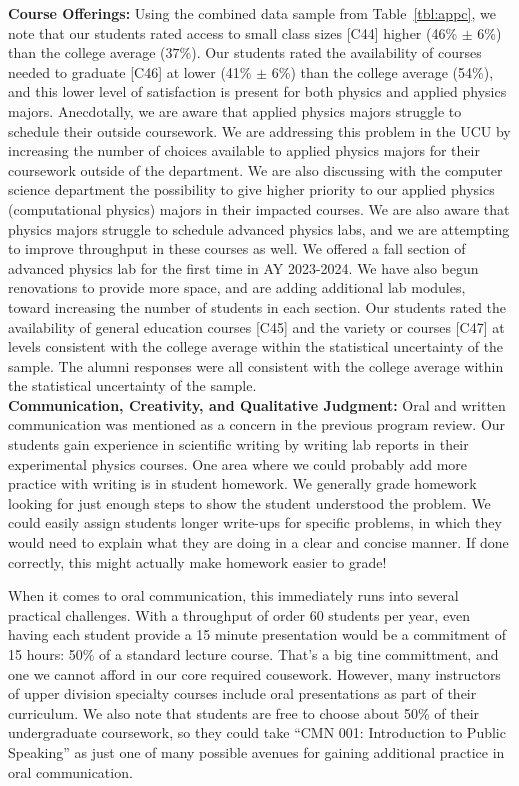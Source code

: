 \documentclass[12pt]{article}
\begin{document}
\noindent
{\bf Course Offerings:} Using the combined data sample from
Table~\ref{tbl:appc}, we note that our students rated access to small
class sizes [C44] higher (46\% $\pm$ 6\%) than the college average
($37\%$).  Our students rated the availability of courses needed to
graduate [C46] at lower (41\% $\pm$ 6\%) than the college average
(54\%), and this lower level of satisfaction is present for both
physics and applied physics majors.  Anecdotally, we are aware that
applied physics majors struggle to schedule their outside coursework.
We are addressing this problem in the UCU by increasing the number of
choices available to applied physics majors for their coursework
outside of the department.  We are also discussing with the computer
science department the possibility to give higher priority to our
applied physics (computational physics) majors in their impacted
courses.  We are also aware that physics majors struggle to schedule
advanced physics labs, and we are attempting to improve throughput in
these courses as well.  We offered a fall section of advanced physics
lab for the first time in AY 2023-2024.  We have also begun
renovations to provide more space, and are adding additional lab
modules, toward increasing the number of students in each section.
Our students rated the availability of general education courses [C45]
and the variety or courses [C47] at levels consistent with the college
average within the statistical uncertainty of the sample.  The alumni
responses were all consistent with the college average within the
statistical uncertainty of the sample.\\[3pt]

\noindent
{\bf Communication, Creativity, and Qualitative Judgment:} Oral and
written communication was mentioned as a concern in the previous
program review.  Our students gain experience in scientific writing by
writing lab reports in their experimental physics courses.  One area
where we could probably add more practice with writing is in student
homework.  We generally grade homework looking for just enough steps
to show the student understood the problem.  We could easily assign
students longer write-ups for specific problems, in which they would
need to explain what they are doing in a clear and concise manner.
If done correctly, this might actually make homework easier to grade!

When it comes to oral communication, this immediately runs into
several practical challenges.  With a throughput of order 60 students
per year, even having each student provide a 15 minute presentation
would be a commitment of 15 hours: 50\% of a standard lecture course.
That's a big tine committment, and one we cannot afford in our core
required cousework.  However, many instructors of upper division
specialty courses include oral presentations as part of their
curriculum.  We also note that students are free to choose about 50\%
of their undergraduate coursework, so they could take ``CMN 001:
Introduction to Public Speaking'' as just one of many possible avenues
for gaining additional practice in oral communication.
\end{document}
